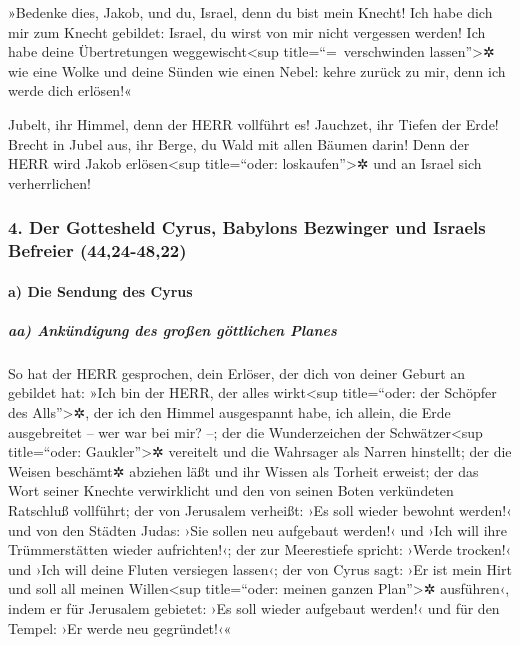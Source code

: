 »Bedenke dies, Jakob, und du, Israel, denn du bist mein
Knecht! Ich habe dich mir zum Knecht gebildet: Israel, du wirst von mir
nicht vergessen werden! Ich habe deine Übertretungen
weggewischt\textless sup title=``=~verschwinden lassen''\textgreater✲
wie eine Wolke und deine Sünden wie einen Nebel: kehre zurück zu mir,
denn ich werde dich erlösen!«

Jubelt, ihr Himmel, denn der HERR vollführt es! Jauchzet,
ihr Tiefen der Erde! Brecht in Jubel aus, ihr Berge, du Wald mit allen
Bäumen darin! Denn der HERR wird Jakob erlösen\textless sup
title=``oder: loskaufen''\textgreater✲ und an Israel sich verherrlichen!

\hypertarget{der-gottesheld-cyrus-babylons-bezwinger-und-israels-befreier-4424-4822}{%
\subsubsection{4. Der Gottesheld Cyrus, Babylons Bezwinger und Israels
Befreier
(44,24-48,22)}\label{der-gottesheld-cyrus-babylons-bezwinger-und-israels-befreier-4424-4822}}

\hypertarget{a-die-sendung-des-cyrus}{%
\paragraph{a) Die Sendung des Cyrus}\label{a-die-sendung-des-cyrus}}

\hypertarget{aa-ankuxfcndigung-des-grouxdfen-guxf6ttlichen-planes}{%
\subparagraph{aa) Ankündigung des großen göttlichen
Planes}\label{aa-ankuxfcndigung-des-grouxdfen-guxf6ttlichen-planes}}

So hat der HERR gesprochen, dein Erlöser, der dich von
deiner Geburt an gebildet hat: »Ich bin der HERR, der alles
wirkt\textless sup title=``oder: der Schöpfer des Alls''\textgreater✲,
der ich den Himmel ausgespannt habe, ich allein, die Erde ausgebreitet
-- wer war bei mir? --; der die Wunderzeichen der
Schwätzer\textless sup title=``oder: Gaukler''\textgreater✲ vereitelt
und die Wahrsager als Narren hinstellt; der die Weisen beschämt✲
abziehen läßt und ihr Wissen als Torheit erweist; der das
Wort seiner Knechte verwirklicht und den von seinen Boten verkündeten
Ratschluß vollführt; der von Jerusalem verheißt: ›Es soll wieder bewohnt
werden!‹ und von den Städten Judas: ›Sie sollen neu aufgebaut werden!‹
und ›Ich will ihre Trümmerstätten wieder aufrichten!‹;
der zur Meerestiefe spricht: ›Werde trocken!‹ und ›Ich
will deine Fluten versiegen lassen‹; der von Cyrus sagt:
›Er ist mein Hirt und soll all meinen Willen\textless sup title=``oder:
meinen ganzen Plan''\textgreater✲ ausführen‹, indem er für Jerusalem
gebietet: ›Es soll wieder aufgebaut werden!‹ und für den Tempel: ›Er
werde neu gegründet!‹«

